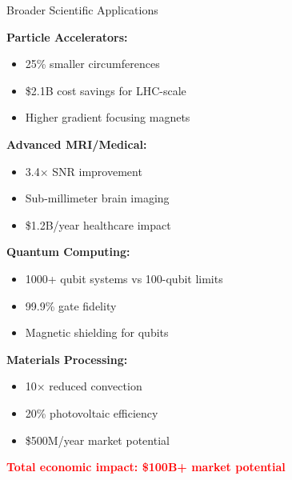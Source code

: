 \documentclass[aspectratio=169,xcolor={table,dvipsnames}]{beamer}
\newcommand{\highlight}[1]{\textcolor{red}{\textbf{#1}}}
\begin{document}
\begin{frame}{Broader Scientific Applications}
    \begin{multicols}{2}
        \textbf{Particle Accelerators:}
        \begin{itemize}
            \item 25\% smaller circumferences
            \item \$2.1B cost savings for LHC-scale
            \item Higher gradient focusing magnets
        \end{itemize}
        
        \textbf{Advanced MRI/Medical:}
        \begin{itemize}
            \item 3.4× SNR improvement
            \item Sub-millimeter brain imaging
            \item \$1.2B/year healthcare impact
        \end{itemize}
        
        \textbf{Quantum Computing:}
        \begin{itemize}
            \item 1000+ qubit systems vs 100-qubit limits
            \item 99.9\% gate fidelity
            \item Magnetic shielding for qubits
        \end{itemize}
        
        \textbf{Materials Processing:}
        \begin{itemize}
            \item 10× reduced convection
            \item 20\% photovoltaic efficiency
            \item \$500M/year market potential
        \end{itemize}
    \end{multicols}
    
    \vspace{0.3cm}
    \begin{center}
        \highlight{Total economic impact: \$100B+ market potential}
    \end{center}
\end{frame}

\end{document}
